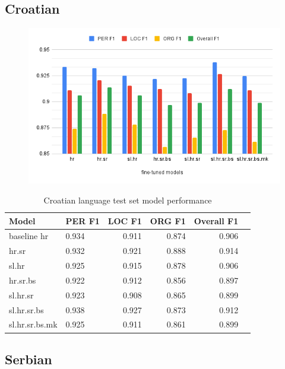 \documentclass[sigconf]{acmart}
\begin{document}
\subsection{Croatian}

\begin{figure}[h]
  \label{fig:eval_hr}
  \centering
  \includegraphics[width=\linewidth]{eval_hr}
\end{figure}

\begin{table}[H]
  \caption{Croatian language test set model performance}
  \label{tab:eval_hr}
  \begin{tabular}{llrrrr}
    \toprule
    Model&PER F1&LOC F1&ORG F1&Overall F1\\
    \midrule
    baseline hr&0.934&0.911&0.874&0.906\\
    \midrule
    hr.sr&0.932&0.921&0.888&0.914\\
    sl.hr&0.925&0.915&0.878&0.906\\
    hr.sr.bs&0.922&0.912&0.856&0.897\\
    sl.hr.sr&0.923&0.908&0.865&0.899\\
    sl.hr.sr.bs&0.938&0.927&0.873&0.912\\
    sl.hr.sr.bs.mk&0.925&0.911&0.861&0.899\\
    \bottomrule
  \end{tabular}
\end{table}

\subsection{Serbian}
\end{document}
